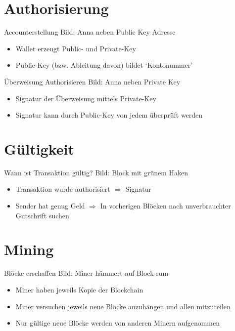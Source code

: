 \documentclass[aspectratio=169]{beamer}
\begin{document}
\section{Authorisierung}

\begin{frame}{Accounterstellung}
    Bild: Anna neben Public Key Adresse
    \begin{itemize}
        \item Wallet erzeugt Public- und Private-Key
        \item Public-Key (bzw. Ableitung davon) bildet `Kontonummer'
    \end{itemize}
\end{frame}


\begin{frame}{Überweisung Authorisieren}
    Bild: Anna neben Private Key
    \begin{itemize}
        \item Signatur der Überweisung mittels Private-Key
        \item Signatur kann durch Public-Key von jedem überprüft werden
    \end{itemize}
\end{frame}





\section{Gültigkeit}

\begin{frame}{Wann ist Transaktion gültig?}
    Bild: Block mit grünem Haken
    \begin{itemize}
        \item Transaktion wurde authorisiert $\Rightarrow$ Signatur
        \item Sender hat genug Geld $\Rightarrow$ In vorherigen Blöcken nach unverbrauchter Gutschrift suchen
    \end{itemize}
\end{frame}





\section{Mining}

\begin{frame}{Blöcke erschaffen}
    Bild: Miner hämmert auf Block rum
    \begin{itemize}
        \item Miner haben jeweils Kopie der Blockchain
        \item Miner versuchen jeweils neue Blöcke anzuhängen und allen mitzuteilen
        \item Nur gültige neue Blöcke werden von anderen Minern aufgenommen
    \end{itemize}
\end{frame}
\end{document}
